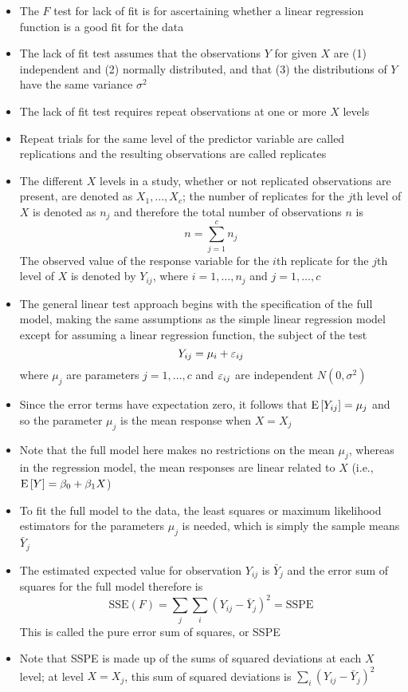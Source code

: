 \begin{itemize} 
\item The $F$ test for lack of fit is for ascertaining whether a linear regression function is a good fit for the data
\item The lack of fit test assumes that the observations $Y$ for given $X$ are (1) independent and (2) normally distributed, and that (3) the distributions of $Y$ have the same variance $\sigma^2$ 
\item The lack of fit test requires repeat observations at one or more $X$ levels
\item Repeat trials for the same level of the predictor variable are called replications and the resulting observations are called replicates
\item The different $X$ levels in a study, whether or not replicated observations are present, are denoted as $X_1, \dots, X_c$; the number of replicates for the $j$th level of $X$ is denoted as $n_j$ and therefore the total number of observations $n$ is $$ n = \sum_{j=1}^c n_j $$ 
The observed value of the response variable for the $i$th replicate for the $j$th level of $X$ is denoted by $Y_{ij}$, where $i=1,\dots,n_j$ and $j=1,\dots,c$
\item The general linear test approach begins with the specification of the full model, making the same assumptions as the simple linear regression model except for assuming a linear regression function, the subject of the test $$ Y_{ij} = \mu_i + \varepsilon_{ij} $$ where $\mu_j$ are parameters $j=1,\dots,c$ and $\varepsilon_{ij}$ are independent $N(0,\sigma^2)$ 
\item Since the error terms have expectation zero, it follows that $ \mathrm{E}\left[ Y_{ij} \right] = \mu_j$ and so the parameter $\mu_j$ is the mean response when $X=X_j$ 
\item Note that the full model here makes no restrictions on the mean $\mu_j$, whereas in the regression model, the mean responses are linear related to $X$ (i.e., $\mathrm{E}\left[ Y \right] = \beta_0 + \beta_1X$)
\item To fit the full model to the data, the least squares or maximum likelihood estimators for the parameters $\mu_j$ is needed, which is simply the sample means $\bar{Y}_j$ 
\item The estimated expected value for observation $Y_{ij}$ is $\bar{Y}_j$ and the error sum of squares for the full model therefore is $$ \text{SSE}(F) = \sum_j \sum_i (Y_{ij} - \bar{Y}_j)^2 = \text{SSPE} $$ This is called the pure error sum of squares, or SSPE
\item Note that SSPE is made up of the sums of squared deviations at each $X$ level; at level $X=X_j$, this sum of squared deviations is $\sum_i (Y_{ij} - \bar{Y}_j)^2$ 

\end{itemize}
